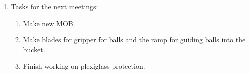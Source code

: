 \begin{enumerate}
\begin{enumerate}
	\end{enumerate}
	
	\item Tasks for the next meetings:
	\begin{enumerate}
		
		\item Make new MOB.
		
		\item Make blades for gripper for balls and the ramp for guiding balls into the bucket.
		
		\item Finish working on plexiglass protection.
			
	\end{enumerate}
\end{enumerate}
\fillpage
